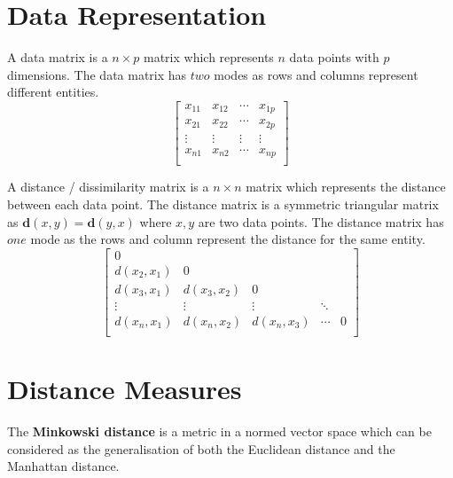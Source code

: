 \documentclass[11pt,fleqn]{book} %
\begin{document}
\section{Data Representation}
\begin{multicols}{2}
\noindent
A data matrix is a $n \times p$ matrix which represents $n$ data points with $p$ dimensions. The data matrix has $two$ modes as rows and columns represent different entities.
\columnbreak
\begin{equation*}
	\begin{bmatrix}
		x_{11} & x_{12} & \cdots & x_{1p} \\
		x_{21} & x_{22} & \cdots & x_{2p} \\
		\vdots & \vdots & \vdots & \vdots \\
		x_{n1} & x_{n2} & \cdots & x_{np} \\
	\end{bmatrix}
\end{equation*}
\end{multicols}

\begin{multicols}{2}
\noindent
A distance / dissimilarity matrix is a $n \times n$ matrix which represents the distance between each data point. The distance matrix is a symmetric triangular matrix as $\mathbf{d}(x, y) = \mathbf{d}(y, x)$ where $x, y$ are two data points. The distance matrix has $one$ mode as the rows and column represent the distance for the same entity.
\columnbreak
\begin{equation*}
	\begin{bmatrix}
		0 & & & & \\
		d(x_2, x_1) & 0 & & & \\
		d(x_3, x_1) & d(x_3, x_2) & 0 & & \\
		\vdots & \vdots & \vdots & \ddots & \\
		d(x_n, x_1) & d(x_n, x_2) & d(x_n, x_3) & \cdots & 0\\
	\end{bmatrix}
\end{equation*}
\end{multicols}

\section{Distance Measures}
The \textbf{Minkowski distance} is a metric in a normed vector space which can be considered as the generalisation of both the Euclidean distance and the Manhattan distance. \\
\end{document}
